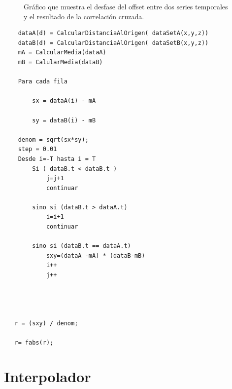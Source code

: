 \begin{figure}[H]
\begin{center}
\hspace{0.5cm}

\end{center}

\caption{Gráfico que muestra el desfase del offset entre dos series temporales y el resultado de la correlación cruzada.}
\end{figure}
	                                
	\begin{lstlisting}
	dataA(d) = CalcularDistanciaAlOrigen( dataSetA(x,y,z))
	dataB(d) = CalcularDistanciaAlOrigen( dataSetB(x,y,z))
	mA = CalcularMedia(dataA)
	mB = CalularMedia(dataB)

	Para cada fila

   		sx = dataA(i) - mA

   		sy = dataB(i) - mB

   	denom = sqrt(sx*sy);
   	step = 0.01
   	Desde i=-T hasta i = T
   		Si ( dataB.t < dataB.t )
			j=j+1
    		continuar

    	sino si (dataB.t > dataA.t)
    		i=i+1
    		continuar

    	sino si (dataB.t == dataA.t)
    		sxy=(dataA -mA) * (dataB-mB)
        	i++
        	j++


   

   r = (sxy) / denom;

   r= fabs(r);
    \end{lstlisting}



\section{Interpolador}

